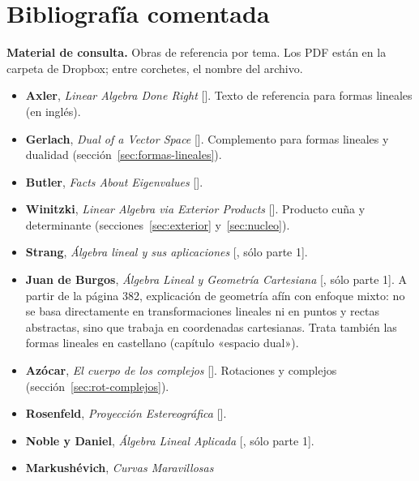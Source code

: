\section{Bibliografía comentada}\label{cap:20}\label{ap:bibliografia}

\textbf{Material de consulta.} Obras de referencia por tema. Los PDF están en la carpeta
 de Dropbox; entre corchetes,
el nombre del archivo.

\begin{itemize}
  \item \textbf{Axler}, \emph{Linear Algebra Done Right} [].
  Texto de referencia para formas lineales (en inglés).
  \item \textbf{Gerlach}, \emph{Dual of a Vector Space} [].
  Complemento para formas lineales y dualidad (sección~\ref{sec:formas-lineales}).
  \item \textbf{Butler}, \emph{Facts About Eigenvalues} [].
  \item \textbf{Winitzki}, \emph{Linear Algebra via Exterior Products}
  []. Producto cuña y determinante
  (secciones~\ref{sec:exterior} y~\ref{sec:nucleo}).
  \item \textbf{Strang}, \emph{Álgebra lineal y sus aplicaciones} [,
  sólo parte 1].
  \item \textbf{Juan de Burgos}, \emph{Álgebra Lineal y Geometría Cartesiana}
  [, sólo parte 1]. A partir de la página 382, explicación de
  geometría afín con enfoque mixto: no se basa directamente en transformaciones lineales ni en
  puntos y rectas abstractas, sino que trabaja en coordenadas cartesianas. Trata también las
  formas lineales en castellano (capítulo «espacio dual»).
  \item \textbf{Azócar}, \emph{El cuerpo de los complejos}
  []. Rotaciones y complejos
  (sección~\ref{sec:rot-complejos}).
  \item \textbf{Rosenfeld}, \emph{Proyección Estereográfica}
  [].
  \item \textbf{Noble y Daniel}, \emph{Álgebra Lineal Aplicada}
  [, sólo parte 1].
  \item \textbf{Markushévich}, \emph{Curvas Maravillosas}

\end{itemize}
